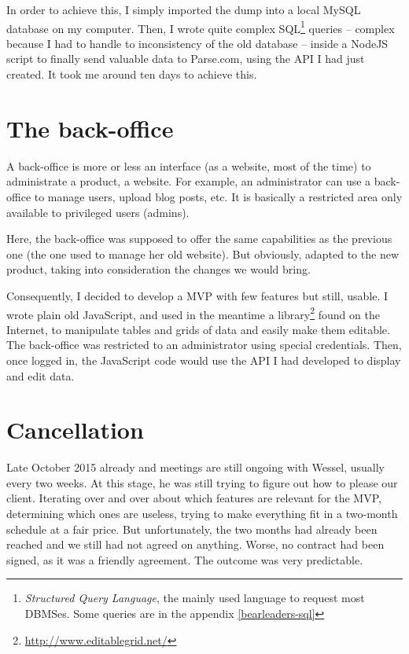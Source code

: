 \medskip

In order to achieve this, I simply imported the dump into a local MySQL database on my computer. Then, I wrote quite complex SQL\footnote{\textit{Structured Query Language}, the mainly used language to request most DBMSes. Some queries are in the appendix \ref{bearleaders-sql}} queries -- complex because I had to handle to inconsistency of the old database -- inside a NodeJS script to finally send valuable data to Parse.com, using the API I had just created. It took me around ten days to achieve this.

\section{The back-office}

A back-office is more or less an interface (as a website, most of the time) to administrate a product, a website. For example, an administrator can use a back-office to manage users, upload blog posts, etc. It is basically a restricted area only available to privileged users (admins).

\medskip

Here, the back-office was supposed to offer the same capabilities as the previous one (the one used to manage her old website). But obviously, adapted to the new product, taking into consideration the changes we would bring.

\medskip

Consequently, I decided to develop a MVP with few features but still, usable. I wrote plain old JavaScript, and used in the meantime a library\footnote{\href{http://www.editablegrid.net/}{http://www.editablegrid.net/}} found on the Internet, to manipulate tables and grids of data and easily make them editable. The back-office was restricted to an administrator using special credentials. Then, once logged in, the JavaScript code would use the API I had developed to display and edit data.

\section{Cancellation}

Late October 2015 already and meetings are still ongoing with Wessel, usually every two weeks. At this stage, he was still trying to figure out how to please our client. Iterating over and over about which features are relevant for the MVP, determining which ones are useless, trying to make everything fit in a two-month schedule at a fair price. But unfortunately, the two months had already been reached and we still had not agreed on anything. Worse, no contract had been signed, as it was a friendly agreement. The outcome was very predictable.

